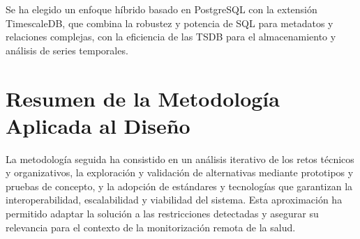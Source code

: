Se ha elegido un enfoque híbrido basado en PostgreSQL con la extensión TimescaleDB, que combina la robustez y potencia de SQL para metadatos y relaciones complejas, con la eficiencia de las TSDB para el almacenamiento y análisis de series temporales.

\section{Resumen de la Metodología Aplicada al Diseño}

La metodología seguida ha consistido en un análisis iterativo de los retos técnicos y organizativos, la exploración y validación de alternativas mediante prototipos y pruebas de concepto, y la adopción de estándares y tecnologías que garantizan la interoperabilidad, escalabilidad y viabilidad del sistema. Esta aproximación ha permitido adaptar la solución a las restricciones detectadas y asegurar su relevancia para el contexto de la monitorización remota de la salud.
